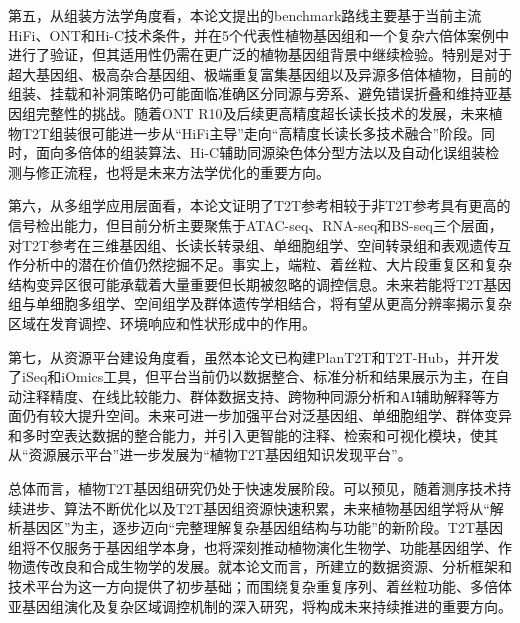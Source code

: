 第五，从组装方法学角度看，本论文提出的benchmark路线主要基于当前主流HiFi、ONT和Hi-C技术条件，并在5个代表性植物基因组和一个复杂六倍体案例中进行了验证，但其适用性仍需在更广泛的植物基因组背景中继续检验。特别是对于超大基因组、极高杂合基因组、极端重复富集基因组以及异源多倍体植物，目前的组装、挂载和补洞策略仍可能面临准确区分同源与旁系、避免错误折叠和维持亚基因组完整性的挑战。随着ONT R10及后续更高精度超长读长技术的发展，未来植物T2T组装很可能进一步从“HiFi主导”走向“高精度长读长多技术融合”阶段。同时，面向多倍体的组装算法、Hi-C辅助同源染色体分型方法以及自动化误组装检测与修正流程，也将是未来方法学优化的重要方向。

第六，从多组学应用层面看，本论文证明了T2T参考相较于非T2T参考具有更高的信号检出能力，但目前分析主要聚焦于ATAC-seq、RNA-seq和BS-seq三个层面，对T2T参考在三维基因组、长读长转录组、单细胞组学、空间转录组和表观遗传互作分析中的潜在价值仍然挖掘不足。事实上，端粒、着丝粒、大片段重复区和复杂结构变异区很可能承载着大量重要但长期被忽略的调控信息。未来若能将T2T基因组与单细胞多组学、空间组学及群体遗传学相结合，将有望从更高分辨率揭示复杂区域在发育调控、环境响应和性状形成中的作用。

第七，从资源平台建设角度看，虽然本论文已构建PlanT2T和T2T-Hub，并开发了iSeq和iOmics工具，但平台当前仍以数据整合、标准分析和结果展示为主，在自动注释精度、在线比较能力、群体数据支持、跨物种同源分析和AI辅助解释等方面仍有较大提升空间。未来可进一步加强平台对泛基因组、单细胞组学、群体变异和多时空表达数据的整合能力，并引入更智能的注释、检索和可视化模块，使其从“资源展示平台”进一步发展为“植物T2T基因组知识发现平台”。

总体而言，植物T2T基因组研究仍处于快速发展阶段。可以预见，随着测序技术持续进步、算法不断优化以及T2T基因组资源快速积累，未来植物基因组学将从“解析基因区”为主，逐步迈向“完整理解复杂基因组结构与功能”的新阶段。T2T基因组将不仅服务于基因组学本身，也将深刻推动植物演化生物学、功能基因组学、作物遗传改良和合成生物学的发展。就本论文而言，所建立的数据资源、分析框架和技术平台为这一方向提供了初步基础；而围绕复杂重复序列、着丝粒功能、多倍体亚基因组演化及复杂区域调控机制的深入研究，将构成未来持续推进的重要方向。


